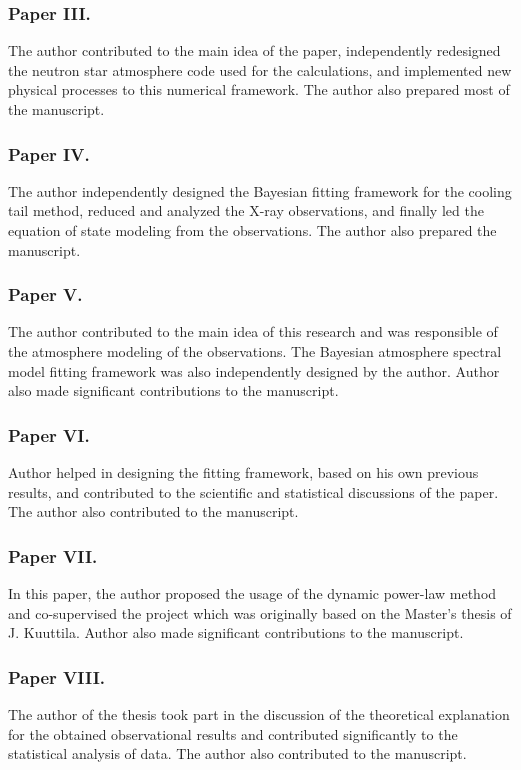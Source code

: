 \subsubsection*{Paper III.}
The author contributed to the main idea of the paper, independently redesigned the neutron star atmosphere code used for the calculations, and implemented new physical processes to this numerical framework. 
The author also prepared most of the manuscript.


\subsubsection*{Paper IV.}
The author independently designed the Bayesian fitting framework for the cooling tail method, reduced and analyzed the X-ray observations, and finally led the equation of state modeling from the observations. 
The author also prepared the manuscript.


\subsubsection*{Paper V.}
The author contributed to the main idea of this research and was responsible of the atmosphere modeling of the observations. The Bayesian atmosphere spectral model fitting framework was also independently designed by the author. 
Author also made significant contributions to the manuscript.


\subsubsection*{Paper VI.}
Author helped in designing the fitting framework, based on his own previous results, and contributed to the scientific and statistical discussions of the paper. 
The author also contributed to the manuscript.


\subsubsection*{Paper VII.}
In this paper, the author proposed the usage of the dynamic power-law method and co-supervised the project which was originally based on the Master's thesis of J. Kuuttila. 
Author also made significant contributions to the manuscript.


\subsubsection*{Paper VIII.}
The author of the thesis took part in the discussion of the theoretical explanation for the obtained observational results and contributed significantly to the statistical analysis of data. 
The author also contributed to the manuscript.



